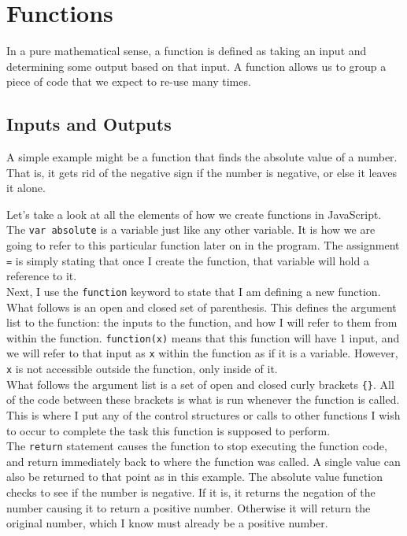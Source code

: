 \chapter{Functions}

In a pure mathematical sense, a function is defined as taking an input and determining some output based on that input. A function allows us to group a piece of code that we expect to re-use many times.

\section{Inputs and Outputs}

A simple example might be a function that finds the absolute value of a number. That is, it gets rid of the negative sign if the number is negative, or else it leaves it alone.


Let's take a look at all the elements of how we create functions in JavaScript. The \texttt{var absolute} is a variable just like any other variable. It is how we are going to refer to this particular function later on in the program. The assignment \texttt{=} is simply stating that once I create the function, that variable will hold a reference to it.\\

Next, I use the \texttt{function} keyword to state that I am defining a new function. What follows is an open and closed set of parenthesis. This defines the argument list to the function: the inputs to the function, and how I will refer to them from within the function. \texttt{function(x)} means that this function will have 1 input, and we will refer to that input as \texttt{x} within the function as if it is a variable. However, \texttt{x} is not accessible outside the function, only inside of it.\\

What follows the argument list is a set of open and closed curly brackets \texttt{\{\}}. All of the code between these brackets is what is run whenever the function is called. This is where I put any of the control structures or calls to other functions I wish to occur to complete the task this function is supposed to perform.\\

The \texttt{return} statement causes the function to stop executing the function code, and return immediately back to where the function was called. A single value can also be returned to that point as in this example. The absolute value function checks to see if the number is negative. If it is, it returns the negation of the number causing it to return a positive number. Otherwise it will return the original number, which I know must already be a positive number.\\

